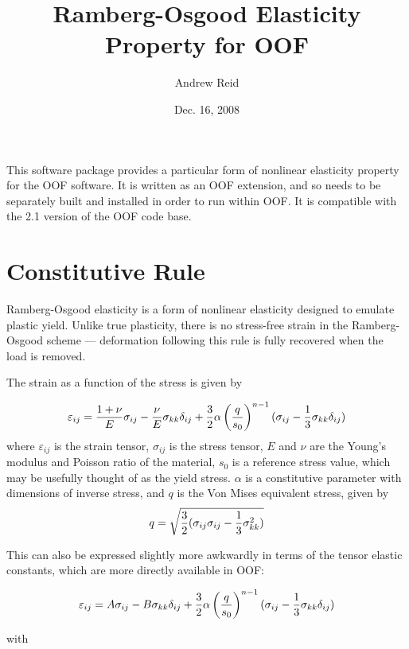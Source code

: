 \documentclass[10pt]{article}
\begin{document}
\title{Ramberg-Osgood Elasticity Property for OOF}
\author{Andrew Reid}
\date{Dec. 16, 2008}
\maketitle

This software package provides a particular form of nonlinear
elasticity property for the OOF software.  It is written as an OOF
extension, and so needs to be separately built and installed in order
to run within OOF.  It is compatible with the 2.1 version of the
OOF code base.

\section{Constitutive Rule}

Ramberg-Osgood elasticity is a form of nonlinear elasticity designed
to emulate plastic yield.  Unlike true plasticity, there is no
stress-free strain in the Ramberg-Osgood scheme --- deformation
following this rule is fully recovered when the load is removed.

The strain as a function of the stress is given by

\begin{equation}
\varepsilon_{ij}={1+\nu \over E}\sigma_{ij}-
	  {\nu \over E}\sigma_{kk}\delta_{ij}+
          {{3 \over 2} \alpha}\left({q \over s_0}\right)^{n-1}
	    (\sigma_{ij}-{1 \over 3}\sigma_{kk}\delta_{ij})
\label{eqn:base} 
\end{equation}
where $\varepsilon_{ij}$ is the strain tensor, $\sigma_{ij}$ is the
stress tensor, $E$ and $\nu$ are the Young's modulus and Poisson ratio
of the material, $s_0$ is a reference stress value, which may be
usefully thought of as the yield stress.  $\alpha$ is a constitutive
parameter with dimensions of inverse stress, and $q$ is the Von Mises
equivalent stress, given by
\[
q=\sqrt{{3 \over 2}(\sigma_{ij}\sigma_{ij}-{1 \over 3}\sigma_{kk}^2)}
\]

This can also be expressed slightly more awkwardly in terms of the
tensor elastic constants, which are more directly available in OOF:

\begin{equation}
\varepsilon_{ij}=A\sigma_{ij}-
	  B\sigma_{kk}\delta_{ij}+ 
          {{3 \over 2} \alpha}\left({q \over s_0}\right)^{n-1}
	  (\sigma_{ij}-{1 \over 3}\sigma_{kk}\delta_{ij})
\label{eqn:rule}
\end{equation}

with
\end{document}

